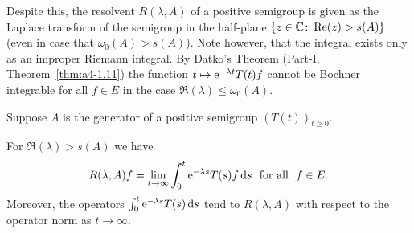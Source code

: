 Despite this, the resolvent $R(\lambda,A)$ of a positive semigroup is given as the Laplace transform%
of the semigroup in the half-plane $\{z \in \mathbb{C}  \colon \mathop{}\!\mathrm{Re}(z) > s(A)\}$ (even in case that $\omega_0(A) > s(A)$).
Note however, that the integral exists only as an improper Riemann integral.
By Datko's Theorem (Part-I, Theorem~\ref{thm:a4-1.11}) the function $t \mapsto \mathrm{e}^{-\lambda t}T(t)f$ cannot be Bochner integrable for all $f \in E$ in the case $\Re(\lambda) \leq \omega_0(A)$.
\begin{theorem}\label{thm:c3-1.2}
	Suppose $A$ is the generator of a positive semigroup $(T(t))_{t\geq 0}$. 
	
	For\/ $\Re(\lambda) > s(A)$ we have
	\begin{equation}\label{eq:c3-1.1}
		R(\lambda,A)f = \lim_{t\to\infty} \int_{0}^t \mathrm{e}^{-\lambda s} T(s)f \mathop{}\!\mathrm{d}{s}  \ \text{ for all } \ f \in E.
	\end{equation}
	Moreover, the operators $\int_{0}^t \mathrm{e}^{-\lambda s} T(s) \mathop{}\!\mathrm{d}{s} $ tend to $R(\lambda,A)$ with respect to the operator norm as $t \to \infty$.
\end{theorem}
